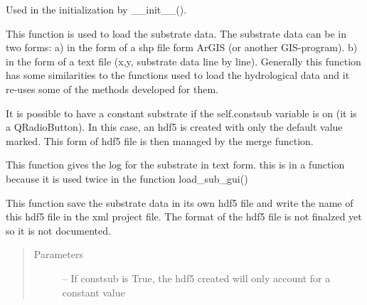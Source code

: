 \documentclass[letterpaper,10pt,english]{sphinxmanual}
\begin{document}
\begin{fulllineitems}
\begin{fulllineitems}
\label{\detokenize{index:src_GUI.hydro_GUI_2.SubstrateW.init_iu}}
Used in the initialization by \_\_init\_\_().

\end{fulllineitems}


\begin{fulllineitems}
\label{\detokenize{index:src_GUI.hydro_GUI_2.SubstrateW.load_sub_gui}}
This function is used to load the substrate data. The substrate data can be in two forms: a) in the form of a shp
file form ArGIS (or another GIS-program). b) in the form of a text file (x,y, substrate data line by line).
Generally this function has some similarities to the functions used to load the hydrological data and it re-uses
some of the methods developed for them.

It is possible to have a constant substrate if the self.constsub variable is on (it is a QRadioButton). In this
case, an hdf5 is created with only the default value marked. This form of hdf5 file is then managed by the merge
function.

\end{fulllineitems}


\begin{fulllineitems}
\label{\detokenize{index:src_GUI.hydro_GUI_2.SubstrateW.log_txt}}
This function gives the log for the substrate in text form. this is in a function because it is used twice in
the function load\_sub\_gui()

\end{fulllineitems}


\begin{fulllineitems}
\label{\detokenize{index:src_GUI.hydro_GUI_2.SubstrateW.save_hdf5_sub}}
This function save the substrate data in its own hdf5 file and write the name of this hdf5 file in the
xml project file. The format of the hdf5 file is not finalzed yet so it is not documented.
\begin{quote}\begin{description}
\item[{Parameters}] \leavevmode
{} -- If constsub is True, the hdf5 created will only account for a constant value


\end{description}
\end{quote}
\end{fulllineitems}
\end{fulllineitems}
\end{document}
